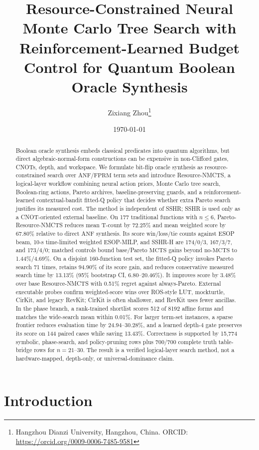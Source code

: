 \documentclass[11pt]{article}
\title{Resource-Constrained Neural Monte Carlo Tree Search with Reinforcement-Learned Budget Control for Quantum Boolean Oracle Synthesis}
\author{Zixiang Zhou\thanks{Hangzhou Dianzi University, Hangzhou, China. ORCID: \url{https://orcid.org/0009-0006-7485-9581}}}
\date{\today}
\newcommand{\method}{Resource-NMCTS}
\newcommand{\anf}{\ensuremath{\mathrm{ANF}}}
\newcommand{\fprm}{\ensuremath{\mathrm{FPRM}}}
\newcommand{\mcts}{\ensuremath{\mathrm{MCTS}}}
\newcommand{\ttable}{truth table}
\begin{document}
\maketitle

\begin{abstract}
Boolean oracle synthesis embeds classical predicates into quantum algorithms,
but direct algebraic-normal-form constructions can be expensive in
non-Clifford gates, CNOTs, depth, and workspace.  We formulate bit-flip oracle
synthesis as resource-constrained search over \anf{}/\fprm{} term sets and
introduce \method{}, a logical-layer workflow combining neural action priors,
Monte Carlo tree search, Boolean-ring actions, Pareto archives,
baseline-preserving guards, and a reinforcement-learned contextual-bandit
fitted-Q policy that decides whether extra Pareto search justifies its measured
cost.  The method is independent of SSHR; SSHR is used only as a CNOT-oriented
external baseline.  On 177 traditional functions with $n\leq6$,
Pareto-\method{} reduces mean T-count by 72.25\% and mean weighted score by
67.80\% relative to direct \anf{} synthesis.  Its score win/loss/tie counts
against ESOP beam, 10-s time-limited weighted ESOP-MILP, and SSHR-H are
174/0/3, 167/3/7, and 173/4/0; matched controls bound base/Pareto \mcts{} gains
beyond no-\mcts{} to 1.44\%/4.69\%.  On a disjoint 160-function test set, the
fitted-Q policy invokes Pareto search 71 times, retains 94.90\% of its score
gain, and reduces conservative measured search time by 13.13\% (95\%
bootstrap CI, 6.80--20.46\%).  It improves score by 3.48\% over base
\method{} with 0.51\% regret against always-Pareto.  External executable
probes confirm weighted-score wins over ROS-style LUT, mockturtle, CirKit, and
legacy RevKit; CirKit is often shallower, and RevKit uses fewer ancillas.  In the phase branch, a rank-trained shortlist scores 512 of
8192 affine forms and matches the wide-search mean within 0.01\%.  For larger
term-set instances, a sparse frontier reduces evaluation time by
24.94--30.28\%, and a learned depth-4 gate preserves its score on 144 paired
cases while saving 13.43\%.  Correctness is supported by
15,774 symbolic, phase-search, and policy-pruning rows plus 700/700 complete
\ttable{}-bridge rows for $n=21$--$30$.  The result is a verified logical-layer
search method, not a hardware-mapped, depth-only, or universal-dominance claim.
\end{abstract}

\section{Introduction}
\end{document}
